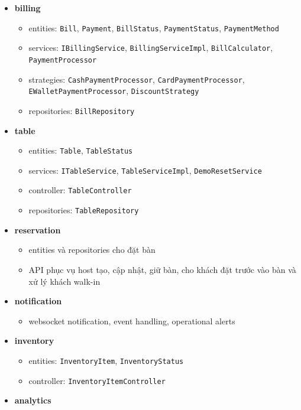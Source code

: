 \documentclass[12pt,a4paper]{article}
\begin{document}
\begin{itemize}
    \item \textbf{billing}
    \begin{itemize}
        \item entities: \texttt{Bill}, \texttt{Payment}, \texttt{BillStatus}, \texttt{PaymentStatus}, \texttt{PaymentMethod}
        \item services: \texttt{IBillingService}, \texttt{BillingServiceImpl}, \texttt{BillCalculator}, \texttt{PaymentProcessor}
        \item strategies: \texttt{CashPaymentProcessor}, \texttt{CardPaymentProcessor}, \texttt{EWalletPaymentProcessor}, \texttt{DiscountStrategy}
        \item repositories: \texttt{BillRepository}
    \end{itemize}
    \item \textbf{table}
    \begin{itemize}
        \item entities: \texttt{Table}, \texttt{TableStatus}
        \item services: \texttt{ITableService}, \texttt{TableServiceImpl}, \texttt{DemoResetService}
        \item controller: \texttt{TableController}
        \item repositories: \texttt{TableRepository}
    \end{itemize}
    \item \textbf{reservation}
    \begin{itemize}
        \item entities và repositories cho đặt bàn
        \item API phục vụ host tạo, cập nhật, giữ bàn, cho khách đặt trước vào bàn và xử lý khách walk-in
    \end{itemize}
    \item \textbf{notification}
    \begin{itemize}
        \item websocket notification, event handling, operational alerts
    \end{itemize}
    \item \textbf{inventory}
    \begin{itemize}
        \item entities: \texttt{InventoryItem}, \texttt{InventoryStatus}
        \item controller: \texttt{InventoryItemController}
    \end{itemize}
    \item \textbf{analytics}

\end{itemize}
\end{document}
